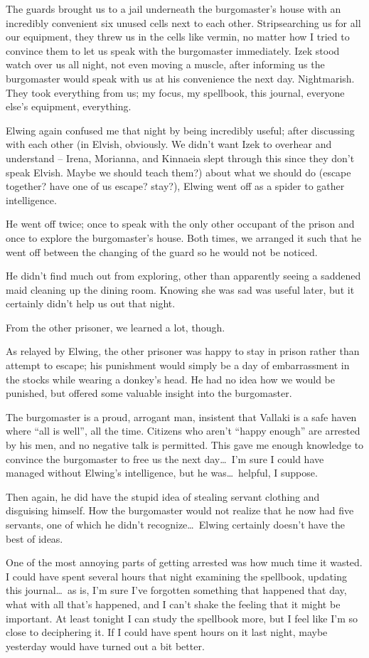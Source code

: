 The guards brought us to a jail underneath the burgomaster's house with an incredibly convenient six unused cells next to each other. Stripsearching us for all our equipment, they threw us in the cells like vermin, no matter how I tried to convince them to let us speak with the burgomaster immediately. Izek stood watch over us all night, not even moving a muscle, after informing us the burgomaster would speak with us at his convenience the next day. Nightmarish. They took everything from us; my focus, my spellbook, this journal, everyone else's equipment, everything.

Elwing again confused me that night by being incredibly useful; after discussing with each other (in Elvish, obviously. We didn't want Izek to overhear and understand -- Irena, Morianna, and Kinnaeia slept through this since they don't speak Elvish. Maybe we should teach them?) about what we should do (escape together? have one of us escape? stay?), Elwing went off as a spider to gather intelligence.

He went off twice; once to speak with the only other occupant of the prison and once to explore the burgomaster's house. Both times, we arranged it such that he went off between the changing of the guard so he would not be noticed.

He didn't find much out from exploring, other than apparently seeing a saddened maid cleaning up the dining room. Knowing she was sad was useful later, but it certainly didn't help us out that night.

From the other prisoner, we learned a lot, though.

As relayed by Elwing, the other prisoner was happy to stay in prison rather than attempt to escape; his punishment would simply be a day of embarrassment in the stocks while wearing a donkey's head. He had no idea how we would be punished, but offered some valuable insight into the burgomaster.

The burgomaster is a proud, arrogant man, insistent that Vallaki is a safe haven where ``all is well'', all the time. Citizens who aren't ``happy enough'' are arrested by his men, and no negative talk is permitted. This gave me enough knowledge to convince the burgomaster to free us the next day\dots\ I'm sure I could have managed without Elwing's intelligence, but he was\dots\ helpful, I suppose.

Then again, he did have the stupid idea of stealing servant clothing and disguising himself. How the burgomaster would not realize that he now had five servants, one of which he didn't recognize\dots\ Elwing certainly doesn't have the best of ideas.

One of the most annoying parts of getting arrested was how much time it wasted. I could have spent several hours that night examining the spellbook, updating this journal\dots\ as is, I'm sure I've forgotten something that happened that day, what with all that's happened, and I can't shake the feeling that it might be important. At least tonight I can study the spellbook more, but I feel like I'm so close to deciphering it. If I could have spent hours on it last night, maybe yesterday would have turned out a bit better.

\sleep

